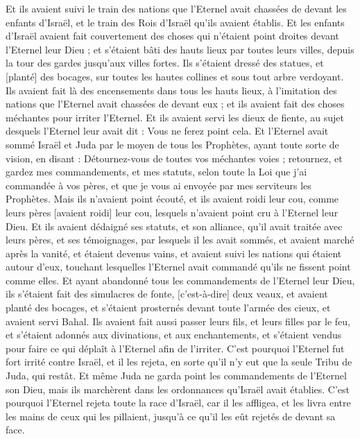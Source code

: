 \begin{multicols}{2}
Et ils avaient suivi le train des nations que l'Eternel avait chassées de devant les enfants d'Israël, et le train des Rois d'Israël qu'ils avaient établis.
Et les enfants d'Israël avaient fait couvertement des choses qui n'étaient point droites devant l'Eternel leur Dieu ; et s'étaient bâti des hauts lieux par toutes leurs villes, depuis la tour des gardes jusqu'aux villes fortes.
Ils s'étaient dressé des statues, et [planté] des bocages, sur toutes les hautes collines et sous tout arbre verdoyant.
Ils avaient fait là des encensements dans tous les hauts lieux, à l'imitation des nations que l'Eternel avait chassées de devant eux ; et ils avaient fait des choses méchantes pour irriter l'Eternel.
Et ils avaient servi les dieux de fiente, au sujet desquels l'Eternel leur avait dit : Vous ne ferez point cela.
Et l'Eternel avait sommé Israël et Juda par le moyen de tous les Prophètes, ayant toute sorte de vision, en disant : Détournez-vous de toutes vos méchantes voies ; retournez, et gardez mes commandements, et mes statuts, selon toute la Loi que j'ai commandée à vos pères, et que je vous ai envoyée par mes serviteurs les Prophètes.
Mais ils n'avaient point écouté, et ils avaient roidi leur cou, comme leurs pères [avaient roidi] leur cou, lesquels n'avaient point cru à l'Eternel leur Dieu.
Et ils avaient dédaigné ses statuts, et son alliance, qu'il avait traitée avec leurs pères, et ses témoignages, par lesquels il les avait sommés, et avaient marché après la vanité, et étaient devenus vains, et avaient suivi les nations qui étaient autour d'eux, touchant lesquelles l'Eternel avait commandé qu'ils ne fissent point comme elles.
Et ayant abandonné tous les commandements de l'Eternel leur Dieu, ils s'étaient fait des simulacres de fonte, [c'est-à-dire] deux veaux, et avaient planté des bocages, et s'étaient prosternés devant toute l'armée des cieux, et avaient servi Bahal.
Ils avaient fait aussi passer leurs fils, et leurs filles par le feu, et s'étaient adonnés aux divinations, et aux enchantements, et s'étaient vendus pour faire ce qui déplaît à l'Eternel afin de l'irriter.
C'est pourquoi l'Eternel fut fort irrité contre Israël, et il les rejeta, en sorte qu'il n'y eut que la seule Tribu de Juda, qui restât.
Et même Juda ne garda point les commandements de l'Eternel son Dieu, mais ils marchèrent dans les ordonnances qu'Israël avait établies.
C'est pourquoi l'Eternel rejeta toute la race d'Israël, car il les affligea, et les livra entre les mains de ceux qui les pillaient, jusqu'à ce qu'il les eût rejetés de devant sa face.

\end{multicols}
